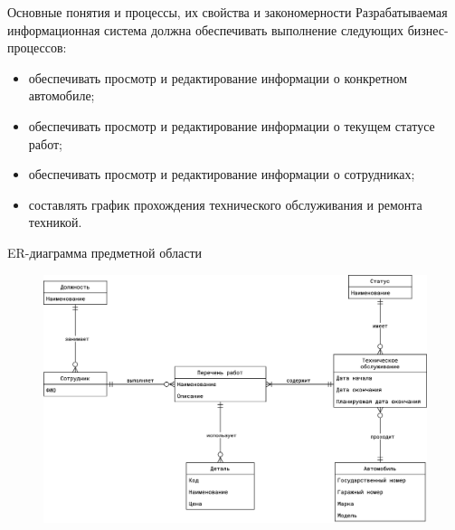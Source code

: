 \documentclass{beamer}
\begin{document}
\begin{frame}
	{Основные понятия и процессы, их свойства и закономерности}
    Разрабатываемая информационная система должна обеспечивать выполнение
    следующих бизнес-процессов:
    \begin{itemize}
      \item обеспечивать просмотр и редактирование информации о конкретном
        автомобиле;
      \item обеспечивать просмотр и редактирование информации о текущем статусе
        работ;
      \item обеспечивать просмотр и редактирование информации о сотрудниках;

      \item составлять график прохождения технического обслуживания и ремонта
        техникой.
    \end{itemize}
\end{frame}

\begin{frame}
	{ER-диаграмма предметной области}
    \begin{figure}[h]
        \centering
        \includegraphics[keepaspectratio,width=\textwidth]{presentation/images/er-diagram.png}
        \label{fig:er-diagram}
    \end{figure}
\end{frame}
\end{document}
